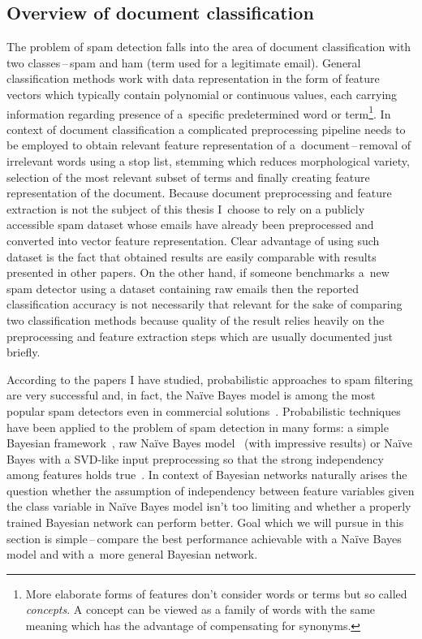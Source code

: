 \documentclass[english,cover]{fitthesis} %
\newcommand{\term}[1]{\emph{#1}}           %
\begin{document}
\subsection{Overview of document classification}
The problem of spam detection falls into the area of document classification with two classes\,--\,spam and ham (term used for a legitimate email). General classification methods work with data representation in the form of feature vectors which typically contain polynomial or continuous values, each carrying information regarding presence of a~specific predetermined word or term\footnote{More elaborate forms of features don't consider words or terms but so called \term{concepts}. A concept can be viewed as a family of words with the same meaning which has the advantage of compensating for synonyms.}. In context of document classification a complicated preprocessing pipeline needs to be employed to obtain relevant feature representation of a~document\,--\,removal of irrelevant words using a stop list, stemming which reduces morphological variety, selection of the most relevant subset of terms and finally creating feature representation of the document. Because document preprocessing and feature extraction is not the subject of this thesis I~choose to rely on a publicly accessible spam dataset whose emails have already been preprocessed and converted into vector feature representation. Clear advantage of using such dataset is the fact that obtained results are easily comparable with results presented in other papers. On the other hand, if someone benchmarks a~new spam detector using a dataset containing raw emails then the reported classification accuracy is not necessarily that relevant for the sake of comparing two classification methods because quality of the result relies heavily on the preprocessing and feature extraction steps which are usually documented just briefly.

According to the papers I have studied, probabilistic approaches to spam filtering are very successful and, in fact, the Naïve Bayes model is among the most popular spam detectors even in commercial solutions~\cite{blanzieri09}. Probabilistic techniques have been applied to the problem of spam detection in many forms: a simple Bayesian framework~\cite{isaac09}, raw Naïve Bayes model~\cite{heckerman98_spam} (with impressive results) or Naïve Bayes with a SVD-like input preprocessing so that the strong independency among features holds true~\cite{renuka11}. In context of Bayesian networks naturally arises the question whether the assumption of independency between feature variables given the class variable in Naïve Bayes model isn't too limiting and whether a properly trained Bayesian network can perform better. Goal which we will pursue in this section is simple\,--\,compare the best performance achievable with a Naïve Bayes model and with a~more general Bayesian network.
\end{document}
